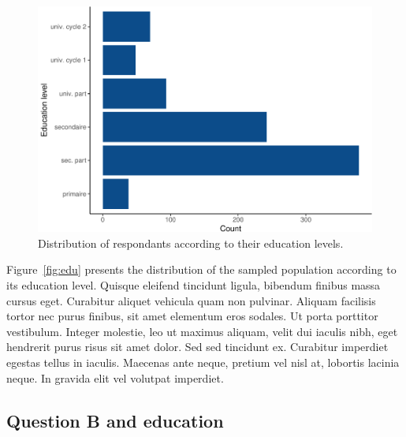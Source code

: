 \documentclass[Afour,times,sageh]{sagej}
\begin{document}
\begin{figure}
\includegraphics[width=1\linewidth]{perception_of_science_files/figure-latex/fig_edu-1} \caption{Distribution of respondants according to their education levels\label{fig:edu}.}\label{fig:fig_edu}
\end{figure}

Figure~\ref{fig:edu} presents the distribution of the sampled population
according to its education level. Quisque eleifend tincidunt ligula,
bibendum finibus massa cursus eget. Curabitur aliquet vehicula quam non
pulvinar. Aliquam facilisis tortor nec purus finibus, sit amet elementum
eros sodales. Ut porta porttitor vestibulum. Integer molestie, leo ut
maximus aliquam, velit dui iaculis nibh, eget hendrerit purus risus sit
amet dolor. Sed sed tincidunt ex. Curabitur imperdiet egestas tellus in
iaculis. Maecenas ante neque, pretium vel nisl at, lobortis lacinia
neque. In gravida elit vel volutpat imperdiet.

\hypertarget{question-b-and-education}{%
\subsection{Question B and education}\label{question-b-and-education}}
\end{document}
